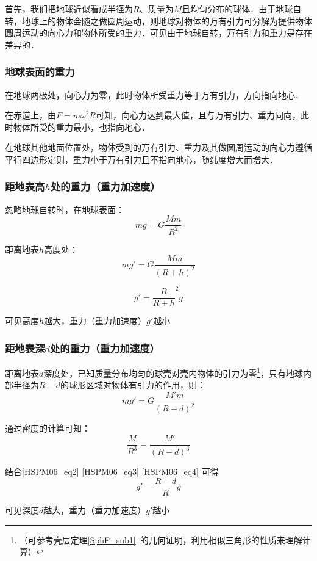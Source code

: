 首先，我们把地球近似看成半径为$R$、质量为$M$且均匀分布的球体．由于地球自转，地球上的物体会随之做圆周运动，则地球对物体的万有引力可分解为提供物体圆周运动的向心力和物体所受的重力．可见由于地球自转，万有引力和重力是存在差异的．

\subsubsection{地球表面的重力}

在地球两极处，向心力为零，此时物体所受重力等于万有引力，方向指向地心．

在赤道上，由$F=m\omega^2R$可知，向心力达到最大值，且与万有引力、重力同向，此时物体所受的重力最小，也指向地心．

在地球其他地面位置处，物体受到的万有引力、重力及其做圆周运动的向心力遵循平行四边形定则，重力小于万有引力且不指向地心，随纬度增大而增大．

\subsubsection{距地表高$h$处的重力（重力加速度）}

忽略地球自转时，在地球表面：
\begin{equation}\label{HSPM06_eq2}
mg=G\frac{Mm}{R^2}
\end{equation}

距离地表$h$高度处：
\begin{equation}
mg'=G\frac{Mm}{(R+h)^2}
\end{equation}

\begin{equation}
g'=\frac{R}{R+h}^2g
\end{equation}

可见高度$h$越大，重力（重力加速度）$g'$越小

\subsubsection{距地表深$d$处的重力（重力加速度）}

距离地表$d$深度处，已知质量分布均匀的球壳对壳内物体的引力为零\footnote{（可参考壳层定理\autoref{SphF_sub1}~的几何证明，利用相似三角形的性质来理解计算）}，只有地球内部半径为$R-d$的球形区域对物体有引力的作用，则：
\begin{equation}\label{HSPM06_eq3}
mg'=G\frac{M'm}{(R-d)^2}
\end{equation}

通过密度的计算可知：
\begin{equation}\label{HSPM06_eq4}
\frac{M}{R^3}=\frac{M'}{(R-d)^3}
\end{equation}

结合\autoref{HSPM06_eq2} \autoref{HSPM06_eq3} \autoref{HSPM06_eq4} 可得
\begin{equation}
g'=\frac{R-d}{R}g
\end{equation}

可见深度$d$越大，重力（重力加速度）$g'$越小